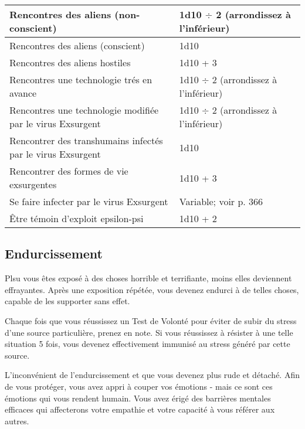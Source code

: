 \begin{table}
\begin{tabularx}{\textwidth}{|X|l|}
Rencontres des aliens (non-conscient)	&1d10 $\div$ 2 (arrondissez à l'inférieur)	\\ \hline

Rencontres des aliens (conscient)	&1d10	\\ \hline

Rencontres des aliens hostiles	&1d10 + 3	\\ \hline

Rencontres une technologie trés en avance	&1d10 $\div$ 2 (arrondissez à l'inférieur)	\\ \hline

Rencontres une technologie modifiée par le virus Exsurgent	&1d10 $\div$ 2 (arrondissez à l'inférieur)	\\ \hline

Rencontrer des transhumains infectés par le virus Exsurgent	&1d10	\\ \hline

Rencontrer des formes de vie exsurgentes	&1d10 + 3	\\ \hline

Se faire infecter par le virus Exsurgent	&Variable; voir p. 366	\\ \hline

Être témoin d'exploit epsilon-psi	&1d10 + 2	\\ \hline

\end{tabularx} \label{tab:stressful-experiences} \end{table} 

\subsection{Endurcissement} \label{sec:hardening} 

Plsu vous êtes exposé à des choses horrible et terrifiante, moins elles deviennent effrayantes. Après une exposition répétée, vous devenez endurci à de telles choses, capable de les supporter sans effet. 

Chaque fois que vous réussissez un Test de Volonté pour éviter de subir du stress d'une source particulière, prenez en note. Si vous réussissez à résister à une telle situation 5 fois, vous devenez effectivement immunisé au stress généré par cette source. 

L'inconvénient de l'endurcissement et que vous devenez plus rude et détaché. Afin de vous protéger, vous avez appri à couper vos émotions - mais ce sont ces émotions qui vous rendent humain. Vous avez érigé des barrières mentales efficaces qui affecterons votre empathie et votre capacité à vous référer aux autres. 

